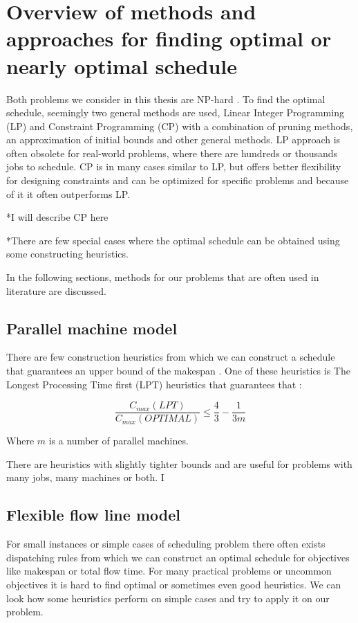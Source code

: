 \documentclass{ctuthesis}
\begin{document}
\section{Overview of methods and approaches for finding optimal or nearly optimal schedule}

Both problems we consider in this thesis are NP-hard \cite{complexity}. To find the optimal schedule, seemingly two general methods are used, Linear Integer Programming (LP) and Constraint Programming (CP) with a combination of pruning methods, an approximation of initial bounds and other general methods. LP approach is often obsolete for real-world problems, where there are hundreds or thousands jobs to schedule. CP is in many cases similar to LP, but offers better flexibility for designing constraints and can be optimized for specific problems and because of it it often outperforms LP.

*I will describe CP here

*There are few special cases where the optimal schedule can be obtained using some constructing heuristics. 

In the following sections, methods for our problems that are often used in literature are discussed.

\subsection{Parallel machine model}

There are few construction heuristics from which we can construct a schedule that guarantees an upper bound of the makespan \cite{gram}. One of these heuristics is The Longest Processing Time first (LPT) heuristics \cite{pinedo} that guarantees that \cite{gram1969}:

\begin{equation}
\dfrac{C_{max}(LPT)}{C_{max}(OPTIMAL)} \leq \dfrac{4}{3} - \dfrac{1}{3m}
\end{equation}

Where $m$ is a number of parallel machines.

There are heuristics with slightly tighter bounds and are useful for problems with many jobs, many machines or both. I 

\subsection{Flexible flow line model}

For small instances or simple cases of scheduling problem there often exists dispatching rules from which we can construct an optimal schedule for objectives like makespan or total flow time. For many practical problems or uncommon objectives it is hard to find optimal or sometimes even good heuristics. We can look how some heuristics perform on simple cases and try to apply it on our problem. 
\end{document}
